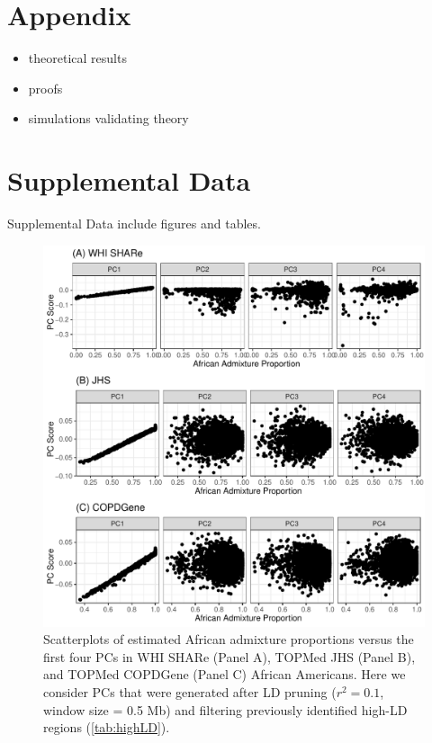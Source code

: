 \documentclass[12pt]{article}
\newcommand{\add}[1]{{\color{red}{[... #1 ...]}}}
\begin{document}


\newpage
\section{Appendix}


\begin{itemize}
\item theoretical results
\item proofs
\item simulations validating theory
\end{itemize}


\newpage
\section*{Supplemental Data}


Supplemental Data include \add{??} figures and \add{??} tables.

\begin{figure}[h]
\center
\includegraphics[width=\textwidth]{figs/pcs_vs_global/pruned_pcs_vs_global}
\caption{Scatterplots of estimated African admixture proportions versus the first four PCs in WHI SHARe (Panel A), TOPMed JHS (Panel B), and TOPMed COPDGene (Panel C) African Americans. Here we consider PCs that were generated after LD pruning ($r^2 = 0.1$, window size = 0.5 Mb) and filtering previously identified high-LD regions (\ref{tab:highLD}).}
\label{fig:prunedpcsvsglob}
\end{figure}
\end{document}
